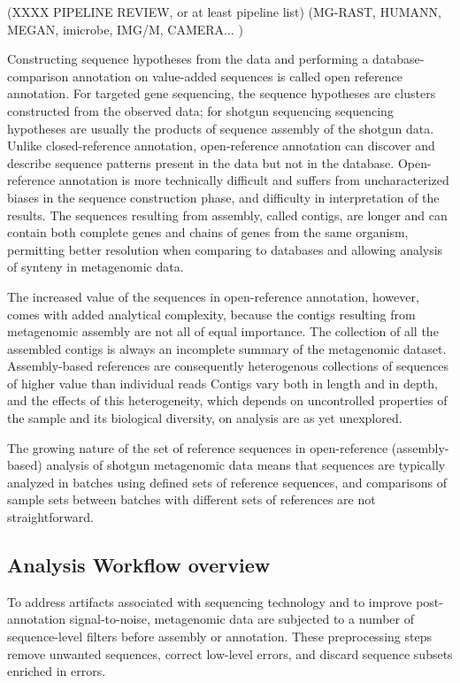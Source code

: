 \documentclass[graybox]{svmult}
\begin{document}
(XXXX PIPELINE REVIEW, or at least pipeline list)  (MG-RAST, HUMANN, MEGAN, imicrobe, IMG/M, CAMERA... )

Constructing sequence hypotheses from the data and performing a database-comparison annotation on value-added sequences is called open reference annotation.   For targeted gene sequencing, the sequence hypotheses are clusters constructed from the observed data; for shotgun sequencing sequencing hypotheses are usually the products of sequence assembly of the shotgun data.   Unlike closed-reference annotation, open-reference annotation can discover and describe sequence patterns present in the data but not in the database.  Open-reference annotation is more technically difficult and suffers from uncharacterized biases in the sequence construction phase, and difficulty in interpretation of the results.  The sequences resulting from assembly, called contigs, are longer and can contain both complete genes and chains of genes from the same organism, permitting better resolution when comparing to databases and allowing analysis of synteny in metagenomic data.

The increased value of the sequences in open-reference annotation, however, comes with added analytical complexity, because the contigs resulting from metagenomic assembly are not all of equal importance.
The collection of all the assembled contigs is always an incomplete summary of the metagenomic dataset.
Assembly-based references are consequently heterogenous collections of sequences of higher value than individual reads
Contigs vary both in length and in depth, and the effects of this heterogeneity, which depends on uncontrolled properties of the sample and its biological diversity, on analysis are as yet unexplored.

The growing nature of the set of reference sequences in open-reference (assembly-based) analysis of shotgun metagenomic data means that sequences are typically analyzed in batches using defined sets of reference sequences, and comparisons of sample sets between batches with different sets of references are not straightforward.

\subsection{Analysis Workflow overview}
        To address artifacts associated with sequencing technology and to improve post-annotation signal-to-noise, metagenomic data are subjected to a number of sequence-level filters before assembly or annotation.  These preprocessing steps remove unwanted sequences, correct low-level errors, and discard sequence subsets enriched in errors.
\end{document}
